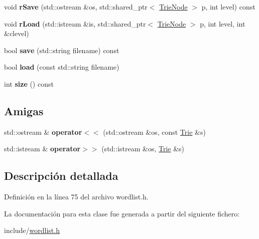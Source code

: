 \begin{DoxyCompactItemize}
\item 
\mbox{\label{classTrie_ab095672df317524d593a9b2730d33285}} 
void {\bfseries r\+Save} (std\+::ostream \&os, std\+::shared\+\_\+ptr$<$ \hyperlink{classTrieNode}{Trie\+Node} $>$ p, int level) const
\item 
\mbox{\label{classTrie_ac3a88126c73f3c62624933227c855a09}} 
void {\bfseries r\+Load} (std\+::istream \&is, std\+::shared\+\_\+ptr$<$ \hyperlink{classTrieNode}{Trie\+Node} $>$ p, int level, int \&clevel)
\item 
\mbox{\label{classTrie_aefeaac5452e2e930c330f56795b6c83e}} 
bool {\bfseries save} (std\+::string filename) const
\item 
\mbox{\label{classTrie_a24b124179d5e4ae7f84d80b21660aafb}} 
bool {\bfseries load} (const std\+::string filename)
\item 
\mbox{\label{classTrie_af1317f01af35b2b807dda69f2e37c6f1}} 
int {\bfseries size} () const
\end{DoxyCompactItemize}
\subsection*{Amigas}
\begin{DoxyCompactItemize}
\item 
\mbox{\label{classTrie_a5d7ad760deae225e8622a334a614bd27}} 
std\+::ostream \& {\bfseries operator$<$$<$} (std\+::ostream \&os, const \hyperlink{classTrie}{Trie} \&s)
\item 
\mbox{\label{classTrie_a52b5d1a4b919a0b97609d654110576c8}} 
std\+::istream \& {\bfseries operator$>$$>$} (std\+::istream \&os, \hyperlink{classTrie}{Trie} \&s)
\end{DoxyCompactItemize}


\subsection{Descripción detallada}


Definición en la línea 75 del archivo wordlist.\+h.



La documentación para esta clase fue generada a partir del siguiente fichero\+:\begin{DoxyCompactItemize}
\item 
include/\hyperlink{wordlist_8h}{wordlist.\+h}\end{DoxyCompactItemize}
